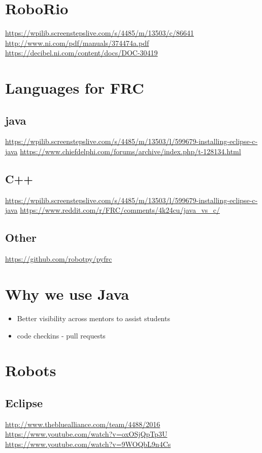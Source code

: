 \documentclass[12pt]{article}
\begin{document}
\section{RoboRio}
\url{https://wpilib.screenstepslive.com/s/4485/m/13503/c/86641}
\url{http://www.ni.com/pdf/manuals/374474a.pdf}
\url{https://decibel.ni.com/content/docs/DOC-30419}

\section{Languages for FRC}
\subsection{java}
\url{https://wpilib.screenstepslive.com/s/4485/m/13503/l/599679-installing-eclipse-c-java}
\url{https://www.chiefdelphi.com/forums/archive/index.php/t-128134.html}

\subsection{C++}
\url{https://wpilib.screenstepslive.com/s/4485/m/13503/l/599679-installing-eclipse-c-java}
\url{https://www.reddit.com/r/FRC/comments/4k24cu/java_vs_c/}

\subsection{Other}
\url{https://github.com/robotpy/pyfrc}

\section{Why we use Java}
\begin{itemize}
    \item Better visibility across mentors to assist students
    \item code checkins - pull requests
\end{itemize}

\section{Robots}
\subsection{Eclipse}
\url{http://www.thebluealliance.com/team/4488/2016}
\url{https://www.youtube.com/watch?v=oxOSjQpTp3U}
\url{https://www.youtube.com/watch?v=9WOQbL9n4Cs}
\end{document}
